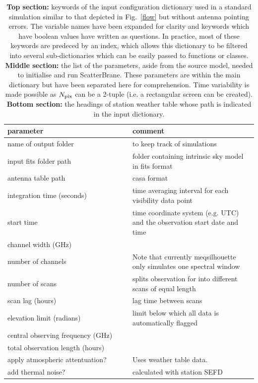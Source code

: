 \begin{longtable}{p{0.5\linewidth}|p{0.6\linewidth}}
\caption[Keywords of the input configuration dictionary used in a standard simulation.]{{\bf Top section:} keywords of the input configuration dictionary used in a standard simulation similar to that depicted in Fig.~\ref{flow} but without antenna pointing errors. The variable names have been expanded for clarity and keywords which have boolean values have written as questions. In practice, most of these keywords are predeced by an index, which allows this dictionary to be filtered into several sub-dictionaries which can be easily passed to functions or classes. {\bf Middle section:} the list of the parameters, aside from the source model, needed to initialise and run {\sc ScatterBrane}. These parameters are within the main dictionary but have been separated here for comprehension. Time variability is made possible as $N_{\rm pix}$ can be a 2-tuple (i.e. a rectangular screen can be created). {\bf Bottom section:} the headings of station weather table whose path is indicated in the input dictionary.}\label{tab:parameters}\\
\hline
parameter&comment\\
\hline
name of output folder&to keep track of simulations\\
input fits folder path&folder containing intrinsic sky model in {\sc fits} format\\
antenna table path&{\sc casa} format \\
integration time (seconds)&time averaging interval for each visibility data point\\
start time&time coordinate system (e.g. UTC) and the observation start date and time\\
channel width (GHz)&\\
number of channels& Note that currently {\sc meqsilhouette} only simulates one spectral window\\
number of scans & splits observation for into different scans of equal length\\
scan lag (hours)& lag time between scans\\
elevation limit (radians) & limit below which all data is automatically flagged\\
central observing frequency (GHz)&\\
total observation length (hours)&\\
apply atmospheric attentuation?& Uses weather table data.\\
add thermal noise?&calculated with station SEFD\\

\end{longtable}
